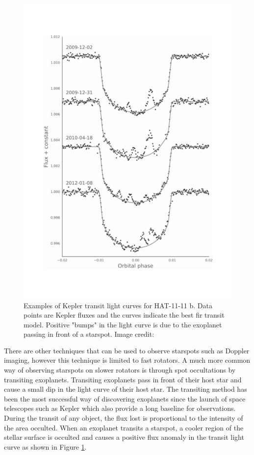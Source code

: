 \begin{figure}
    \centering
    \includegraphics[scale=0.3]{Figures/1-Introduction/hatp_11_spots.pdf}
    \caption[Light curves with examples of starspot "bumps" in exoplanet transits]{Examples of Kepler transit light curves for HAT-11-11 b. Data points are Kepler fluxes and the curves indicate the best fir transit model. Positive "bumps" in the light curve is due to the exoplanet passing in front of a starspot. Image credit: \citet{Morris_etal_2017}}
    \label{fig:spot_occultation_example}
\end{figure}

There are other techniques that can be used to observe starspots such as Doppler imaging, however this technique is limited to fast rotators. A much more common way of observing starspots on slower rotators is through spot occultations by transiting exoplanets. Transiting exoplanets pass in front of their host star and cause a small dip in the light curve of their host star. The transiting method has been the most successful way of discovering exoplanets since the launch of space telescopes such as Kepler which also provide a long baseline for observations. During the transit of any object, the flux lost is proportional to the intensity of the area occulted. When an exoplanet transits a starspot, a cooler region of the stellar surface is occulted and causes a positive flux anomaly in the transit light curve as shown in Figure \ref{fig:spot_occultation_example}.

